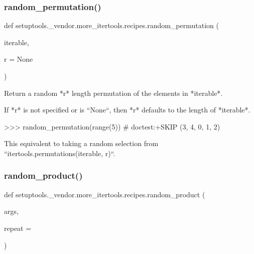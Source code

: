 \subsubsection{\texorpdfstring{random\+\_\+permutation()}{random\_permutation()}}
{\footnotesize\ttfamily def setuptools.\+\_\+vendor.\+more\+\_\+itertools.\+recipes.\+random\+\_\+permutation (\begin{DoxyParamCaption}\item[{}]{iterable,  }\item[{}]{r = {\ttfamily None} }\end{DoxyParamCaption})}

\begin{DoxyVerb}Return a random *r* length permutation of the elements in *iterable*.

If *r* is not specified or is ``None``, then *r* defaults to the length of
*iterable*.

    >>> random_permutation(range(5))  # doctest:+SKIP
    (3, 4, 0, 1, 2)

This equivalent to taking a random selection from
``itertools.permutations(iterable, r)``.\end{DoxyVerb}
 \mbox{\label{namespacesetuptools_1_1__vendor_1_1more__itertools_1_1recipes_ac8db4041850a189df0a357e37c1b023e}} 
\subsubsection{\texorpdfstring{random\+\_\+product()}{random\_product()}}
{\footnotesize\ttfamily def setuptools.\+\_\+vendor.\+more\+\_\+itertools.\+recipes.\+random\+\_\+product (\begin{DoxyParamCaption}\item[{}]{args,  }\item[{}]{repeat = {} }\end{DoxyParamCaption})}

